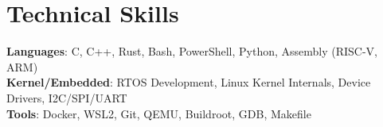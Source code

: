 \section{Technical Skills}
 \begin{itemize}[leftmargin=0.15in, label={}]
    \small{\item{
     \textbf{Languages}{: C, C++, Rust, Bash, PowerShell, Python, Assembly (RISC-V, ARM)} \\
     \textbf{Kernel/Embedded}{: RTOS Development, Linux Kernel Internals, Device Drivers, I2C/SPI/UART} \\
     \textbf{Tools}{: Docker, WSL2, Git, QEMU, Buildroot, GDB, Makefile}
    }}
 \end{itemize}